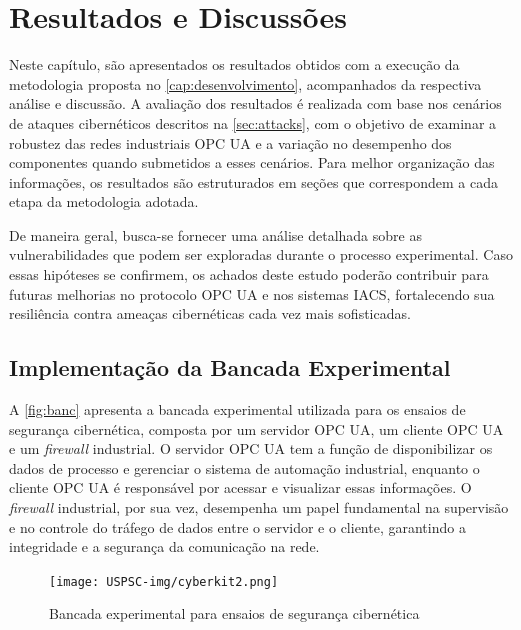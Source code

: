 \chapter{Resultados e Discussões} \label{cap:resultados}

Neste capítulo, são apresentados os resultados obtidos com a execução da metodologia proposta no \autoref{cap:desenvolvimento}, acompanhados da respectiva análise e discussão. A avaliação dos resultados é realizada com base nos cenários de ataques cibernéticos descritos na \autoref{sec:attacks}, com o objetivo de examinar a robustez das redes industriais OPC UA e a variação no desempenho dos componentes quando submetidos a esses cenários. Para melhor organização das informações, os resultados são estruturados em seções que correspondem a cada etapa da metodologia adotada.

De maneira geral, busca-se fornecer uma análise detalhada sobre as vulnerabilidades que podem ser exploradas durante o processo experimental. Caso essas hipóteses se confirmem, os achados deste estudo poderão contribuir para futuras melhorias no protocolo OPC UA e nos sistemas IACS, fortalecendo sua resiliência contra ameaças cibernéticas cada vez mais sofisticadas.

\section{Implementação da Bancada Experimental} \label{sec:impl-bancada}

    A \autoref{fig:banc} apresenta a bancada experimental utilizada para os ensaios de segurança cibernética, composta por um servidor OPC UA, um cliente OPC UA e um \textit{firewall} industrial. O servidor OPC UA tem a função de disponibilizar os dados de processo e gerenciar o sistema de automação industrial, enquanto o cliente OPC UA é responsável por acessar e visualizar essas informações. O \textit{firewall} industrial, por sua vez, desempenha um papel fundamental na supervisão e no controle do tráfego de dados entre o servidor e o cliente, garantindo a integridade e a segurança da comunicação na rede.

    \begin{figure}[htbp!]
        \caption{\label{fig:banc}Bancada experimental para ensaios de segurança cibernética}
        \begin{center}
            \texttt{[image: USPSC-img/cyberkit2.png]}
        \end{center}
    \end{figure}

